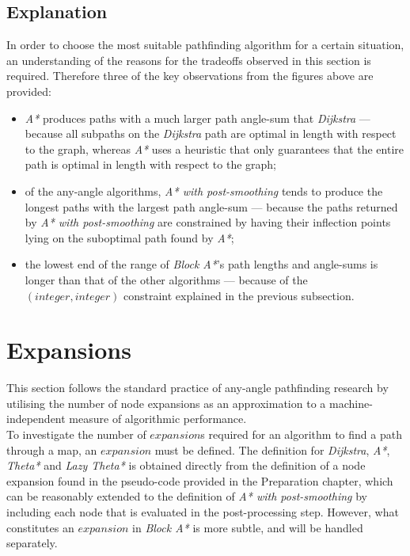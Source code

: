 \documentclass[12pt,notitlepage]{report}
\begin{document}
\subsection{Explanation}
In order to choose the most suitable pathfinding algorithm for a certain situation, an understanding of the reasons for the tradeoffs observed in this section is required. Therefore three of the key observations from the figures above are provided: 
\begin{itemize}
\item {\em A*} produces paths with a much larger path angle-sum that {\em Dijkstra} --- because all subpaths on the {\em Dijkstra} path are optimal in length with respect to the graph, whereas {\em A*} uses a heuristic that only guarantees that the entire path is optimal in length with respect to the graph;
\item of the any-angle algorithms, {\em A* with post-smoothing} tends to produce the longest paths with the largest path angle-sum --- because the paths returned by {\em A* with post-smoothing} are constrained by having their inflection points lying on the suboptimal path found by {\em A*};
\item the lowest end of the range of {\em Block A*}'s path lengths and angle-sums is longer than that of the other algorithms --- because of the $(integer,integer)$ constraint explained in the previous subsection. 
\end{itemize}

\section{Expansions}
This section follows the standard\cite{Nash12} practice of any-angle pathfinding research by utilising the number of node expansions as an approximation to a machine-independent measure of algorithmic performance.\\

\noindent
To investigate the number of $expansion$s required for an algorithm  to find a path through a map, an $expansion$ must be defined. The definition for {\em Dijkstra}, {\em A*}, {\em Theta*} and {\em Lazy Theta*} is obtained directly from the definition of a node expansion found in the pseudo-code provided in the Preparation chapter, which can be reasonably extended to the definition of {\em A* with post-smoothing} by including each node that is evaluated in the post-processing step. However, what constitutes an $expansion$ in {\em Block A*} is more subtle, and will be handled separately.\\
\end{document}
